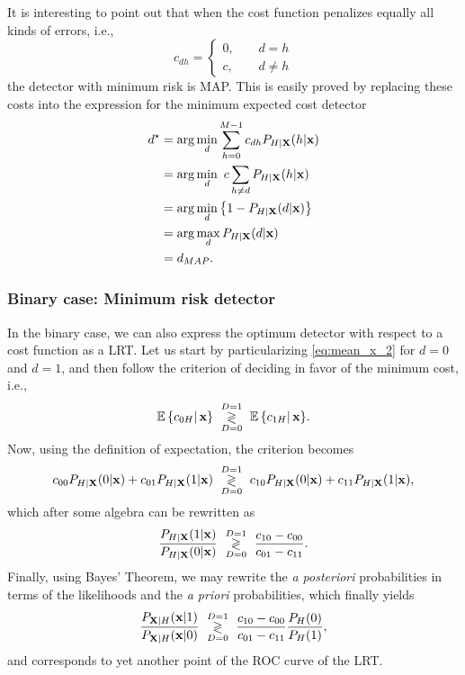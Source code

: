 It is interesting to point out that when the cost function penalizes equally all kinds of errors, i.e.,
$$c_{dh} = \left\{\begin{array}{ll} 0, & \;\;\;\;d=h \\ c, & \;\;\;\;d\neq h\end{array}\right.$$
the detector with minimum risk is MAP. This is easily proved by replacing these costs into the expression for the minimum expected cost detector
\begin{align*}
d^\star & = \arg\min_{d} \sum_{h=0}^{M-1} c_{dh} P_{H|\bf X}(h|{\bf x})  \\
        & = \arg\min_{d} \ c \sum_{h\neq d} P_{H|\bf X}(h|{\bf x})       \\
        & = \arg\min_{d} \left\{1 - P_{H|\bf X}(d|{\bf x})\right\}       \\
        & = \arg\max_{d} P_{H|\bf X}(d|{\bf x})                          \\
        & = d_{MAP}.
\end{align*}


\subsubsection{Binary case: Minimum risk detector}

In the binary case, we can also express the optimum detector with respect to a cost function as a LRT. Let us start by particularizing \eqref{eq:mean_x_2} for $d=0$ and $d=1$, and then follow the criterion of deciding in favor of the minimum cost, i.e.,
$$\mathbb{E}\left\{ c_{0H}\right|{\bf x}\} \,\, \underset{D=0}{\overset{D=1}{\gtrless}}\,\, \mathbb{E}\left\{ c_{1H}\right|{\bf x}\}.$$
Now, using the definition of expectation, the criterion becomes
$$c_{00}P_{H|{\bf X}}(0|{\bf x}) + c_{01} P_{H|{\bf X}}(1|{\bf x})\,\, \underset{D=0}{\overset{D=1}{\gtrless}}\,\, c_{10}P_{H|{\bf X}}(0|{\bf x}) + c_{11} P_{H|{\bf X}}(1|{\bf x}),$$
which after some algebra can be rewritten as
$$\displaystyle\frac{P_{H|{\bf X}}(1|{\bf x})}{P_{H|{\bf X}}(0|{\bf x})}\,\, \underset{D=0}{\overset{D=1}{\gtrless}}\,\, \displaystyle\frac{c_{10}-c_{00}}{c_{01}-c_{11}}.$$
Finally, using Bayes' Theorem, we may rewrite the \emph{a posteriori} probabilities in terms of the likelihoods and the \emph{a priori} probabilities, which finally yields
$$\displaystyle\frac{P_{{\bf X}|H}({\bf x}|1)}{P_{{\bf X}|H}({\bf x}|0)}\,\, \underset{D=0}{\overset{D=1}{\gtrless}}\,\, \displaystyle\frac{c_{10}-c_{00}}{c_{01}-c_{11}} \displaystyle\frac{P_H(0)}{P_H(1)},$$
and corresponds to yet another point of the ROC curve of the LRT.


